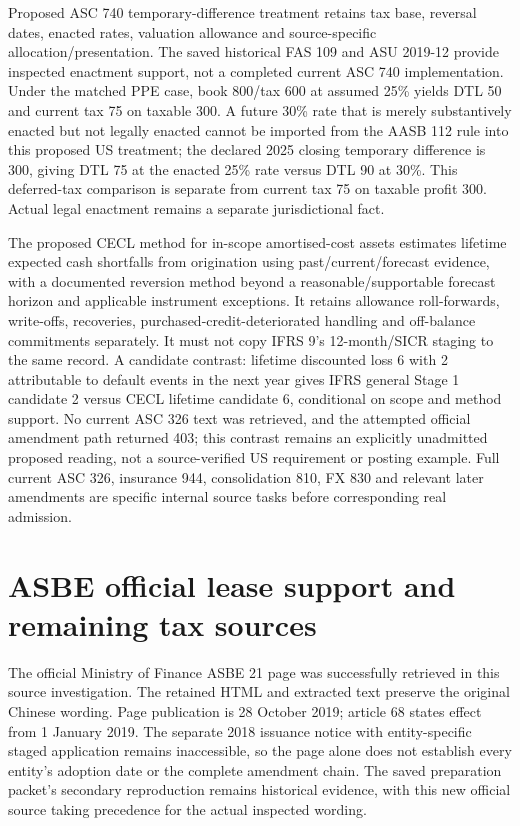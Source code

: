 Proposed ASC 740 temporary-difference treatment retains tax base, reversal dates, enacted rates, valuation allowance and source-specific allocation/presentation. The saved historical FAS 109 and ASU 2019-12 provide inspected enactment support, not a completed current ASC 740 implementation. Under the matched PPE case, book 800/tax 600 at assumed 25\% yields DTL 50 and current tax 75 on taxable 300. A future 30\% rate that is merely substantively enacted but not legally enacted cannot be imported from the AASB 112 rule into this proposed US treatment; the declared 2025 closing temporary difference is 300, giving DTL 75 at the enacted 25\% rate versus DTL 90 at 30\%. This deferred-tax comparison is separate from current tax 75 on taxable profit 300. Actual legal enactment remains a separate jurisdictional fact.

The proposed CECL method for in-scope amortised-cost assets estimates lifetime expected cash shortfalls from origination using past/current/forecast evidence, with a documented reversion method beyond a reasonable/supportable forecast horizon and applicable instrument exceptions. It retains allowance roll-forwards, write-offs, recoveries, purchased-credit-deteriorated handling and off-balance commitments separately. It must not copy IFRS 9's 12-month/SICR staging to the same record. A candidate contrast: lifetime discounted loss 6 with 2 attributable to default events in the next year gives IFRS general Stage 1 candidate 2 versus CECL lifetime candidate 6, conditional on scope and method support. No current ASC 326 text was retrieved, and the attempted official amendment path returned 403; this contrast remains an explicitly unadmitted proposed reading, not a source-verified US requirement or posting example. Full current ASC 326, insurance 944, consolidation 810, FX 830 and relevant later amendments are specific internal source tasks before corresponding real admission.

\hypertarget{asbe-official-lease-support-and-remaining-tax-sources}{%
\section{ASBE official lease support and remaining tax sources}\label{method-standards-methods-asbe-official-lease-support-and-remaining-tax-sources}}

The official Ministry of Finance ASBE 21 page was successfully retrieved in this source investigation. The retained HTML and extracted text preserve the original Chinese wording. Page publication is 28 October 2019; article 68 states effect from 1 January 2019. The separate 2018 issuance notice with entity-specific staged application remains inaccessible, so the page alone does not establish every entity's adoption date or the complete amendment chain. The saved preparation packet's secondary reproduction remains historical evidence, with this new official source taking precedence for the actual inspected wording.

